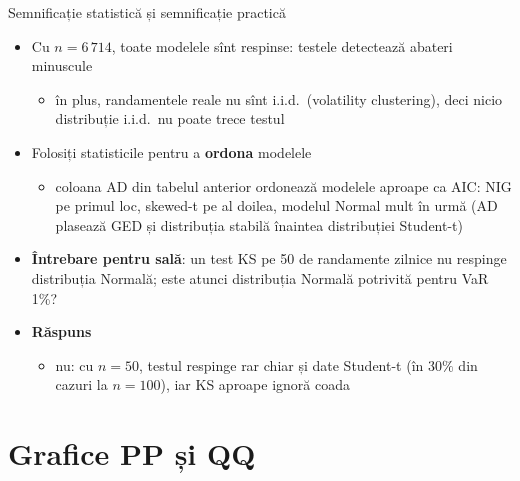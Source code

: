 \begin{frame}{Semnificație statistică și semnificație practică}
\itemsize{\small}
\begin{itemize}
    \item Cu $n = 6\,714$, toate modelele sînt respinse: testele detectează abateri minuscule
    \begin{itemize}
        \item în plus, randamentele reale nu sînt i.i.d.\ (volatility clustering), deci nicio distribuție i.i.d.\ nu poate trece testul
    \end{itemize}
    \item Folosiți statisticile pentru a \textbf{ordona} modelele
    \begin{itemize}
        \item coloana AD din tabelul anterior ordonează modelele aproape ca AIC: NIG pe primul loc, skewed-t pe al doilea, modelul Normal mult în urmă (AD plasează GED și distribuția stabilă înaintea distribuției Student-t)
    \end{itemize}
    \item \textbf{Întrebare pentru sală}: un test KS pe 50 de randamente zilnice nu respinge distribuția Normală; este atunci distribuția Normală potrivită pentru VaR 1\%?
    \item \textbf{Răspuns}
    \begin{itemize}
        \item nu: cu $n = 50$, testul respinge rar chiar și date Student-t (în $30\%$ din cazuri la $n = 100$), iar KS aproape ignoră coada
    \end{itemize}
\end{itemize}
\end{frame}


\section{Grafice PP și QQ}

